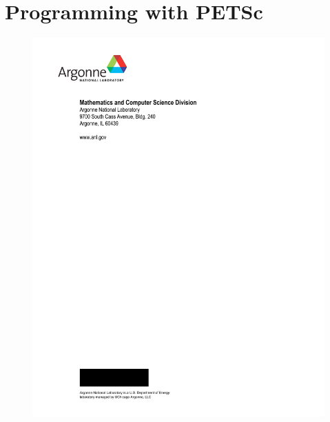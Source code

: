 \part{Programming with PETSc}
\label{part_usage}





\cleardoublepage

\addtocounter{chapter}{1}
\label{sec:bib}


\pagestyle{empty}
\begin{figure}[hbt]
\centerline{\includegraphics{ArgonneReportTemplateLastPage.pdf}}
\caption{}
\end{figure}


